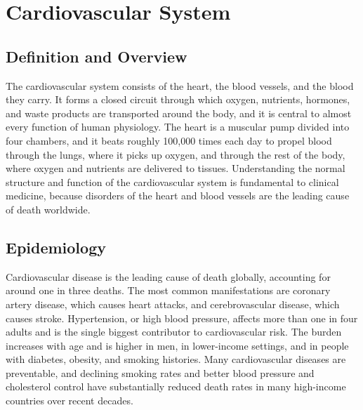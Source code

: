 \chapter{Cardiovascular System}

\section*{Definition and Overview}
The cardiovascular system consists of the heart, the blood vessels, and the blood they carry. It forms a closed circuit through which oxygen, nutrients, hormones, and waste products are transported around the body, and it is central to almost every function of human physiology. The heart is a muscular pump divided into four chambers, and it beats roughly 100,000 times each day to propel blood through the lungs, where it picks up oxygen, and through the rest of the body, where oxygen and nutrients are delivered to tissues. Understanding the normal structure and function of the cardiovascular system is fundamental to clinical medicine, because disorders of the heart and blood vessels are the leading cause of death worldwide.

\section*{Epidemiology}
Cardiovascular disease is the leading cause of death globally, accounting for around one in three deaths. The most common manifestations are coronary artery disease, which causes heart attacks, and cerebrovascular disease, which causes stroke. Hypertension, or high blood pressure, affects more than one in four adults and is the single biggest contributor to cardiovascular risk. The burden increases with age and is higher in men, in lower-income settings, and in people with diabetes, obesity, and smoking histories. Many cardiovascular diseases are preventable, and declining smoking rates and better blood pressure and cholesterol control have substantially reduced death rates in many high-income countries over recent decades.

